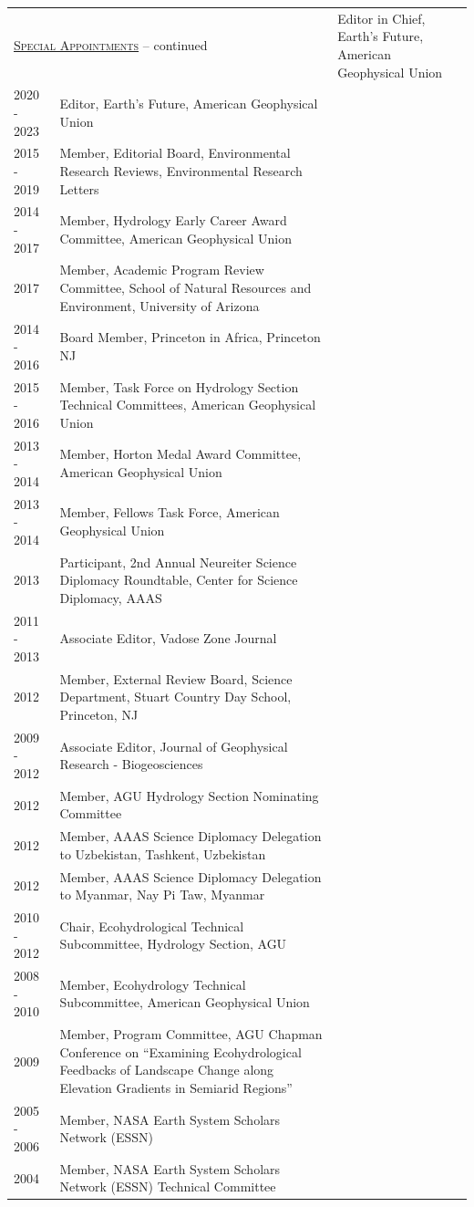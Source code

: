 
\begin{longtable}{l p{5.5in}}

\endfirsthead
\multicolumn{2}{l}{\hspace{.1in} \textsc{\underline{Special Appointments}} -- continued
\vspace*{.1in} }  \endhead

2024 - 2026 & Editor in Chief, Earth's Future, American Geophysical Union \\
2020 - 2023 & Editor, Earth's Future, American Geophysical Union \\
2015 - 2019 & Member, Editorial Board, Environmental Research Reviews, Environmental Research Letters \\
2014 - 2017 & Member, Hydrology Early Career Award Committee, American Geophysical Union \\
2017 & Member, Academic Program Review Committee, School of Natural Resources and Environment, University of Arizona \\
2014 - 2016 & Board Member, Princeton in Africa, Princeton NJ \\
2015 - 2016 & Member, Task Force on Hydrology Section Technical Committees, American Geophysical Union \\
2013 - 2014 & Member, Horton Medal Award Committee, American Geophysical Union \\
2013 - 2014 & Member, Fellows Task Force, American Geophysical Union \\
2013 & Participant, 2nd Annual Neureiter Science Diplomacy Roundtable, Center for Science Diplomacy, AAAS \\
2011 - 2013 & Associate Editor, Vadose Zone Journal \\
2012 & Member, External Review Board, Science Department, Stuart Country Day School, Princeton, NJ \\
2009 - 2012 & Associate Editor, Journal of Geophysical Research - Biogeosciences \\
2012 & Member, AGU Hydrology Section Nominating Committee \\
2012 & Member, AAAS Science Diplomacy Delegation to Uzbekistan, Tashkent, Uzbekistan \\
2012 & Member, AAAS Science Diplomacy Delegation to Myanmar, Nay Pi Taw, Myanmar \\
2010 - 2012 & Chair, Ecohydrological Technical Subcommittee, Hydrology Section, AGU \\
2008 - 2010 & Member, Ecohydrology Technical Subcommittee, American Geophysical Union \\
2009 & Member, Program Committee, AGU Chapman Conference on ``Examining Ecohydrological Feedbacks of Landscape Change along Elevation Gradients in Semiarid Regions'' \\
2005 - 2006 & Member, NASA Earth System Scholars Network (ESSN) \\
2004 & Member, NASA Earth System Scholars Network (ESSN) Technical Committee \\

\end{longtable}
